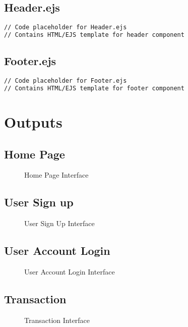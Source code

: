 \documentclass[12pt,a4paper]{report}
\begin{document}
\section{Header.ejs}
\begin{lstlisting}[language=HTML]
// Code placeholder for Header.ejs
// Contains HTML/EJS template for header component
\end{lstlisting}

\section{Footer.ejs}
\begin{lstlisting}[language=HTML]
// Code placeholder for Footer.ejs
// Contains HTML/EJS template for footer component
\end{lstlisting}

\chapter{Outputs}

\section{Home Page}
\begin{figure}[h]
    \centering
    \caption{Home Page Interface}
\end{figure}

\section{User Sign up}
\begin{figure}[h]
    \centering
    \caption{User Sign Up Interface}
\end{figure}

\section{User Account Login}
\begin{figure}[h]
    \centering
    \caption{User Account Login Interface}
\end{figure}

\section{Transaction}
\begin{figure}[h]
    \centering
    \caption{Transaction Interface}
\end{figure}
\end{document}
